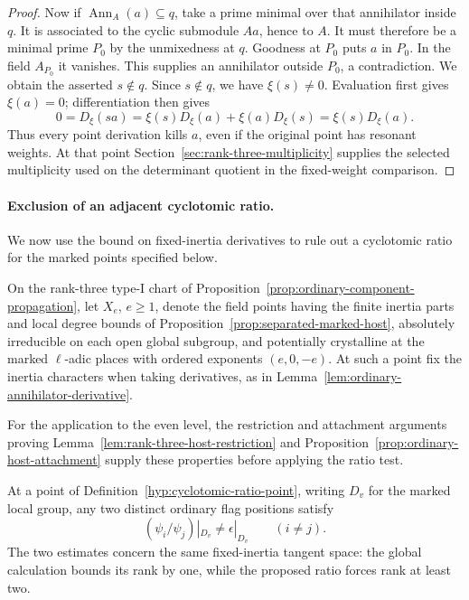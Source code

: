 \begin{proof}
Now if \(\operatorname{Ann}_A(a)\subseteq q\), take a prime
minimal over that annihilator inside \(q\). It is associated
to the cyclic submodule \(Aa\), hence to \(A\). It must
therefore be a minimal prime \(P_0\) by the unmixedness at
\(q\). Goodness at \(P_0\) puts \(a\) in \(P_0\). In the
field \(A_{P_0}\) it vanishes. This supplies an annihilator
outside \(P_0\), a contradiction. We obtain the asserted
\(s\notin q\). Since \(s\notin q\), we have \(\xi(s)\ne0\). Evaluation first gives \(\xi(a)=0\); differentiation then gives 
\[
 0=D_\xi(sa)=\xi(s)D_\xi(a)+\xi(a)D_\xi(s)=\xi(s)D_\xi(a).
\]
 Thus every point derivation kills \(a\), even if the original point has resonant
weights.  At that point Section~\ref{sec:rank-three-multiplicity}
supplies the selected multiplicity used on the determinant
quotient in the fixed-weight comparison.

\end{proof}

\paragraph{Exclusion of an adjacent cyclotomic ratio.}
We now use the bound on fixed-inertia derivatives to rule out a cyclotomic ratio for
the marked points specified below.

\begin{paramdefinition}\label{hyp:cyclotomic-ratio-point}
On the rank-three type-I chart of
Proposition~\ref{prop:ordinary-component-propagation}, let
\(X_e\), \(e\ge1\), denote the field points having the finite
inertia parts and local degree bounds of
Proposition~\ref{prop:separated-marked-host}, absolutely irreducible
on each open global subgroup, and potentially crystalline at the
marked \(\ell\)-adic places with ordered exponents \((e,0,-e)\).
At such a point fix the inertia characters when taking derivatives,
as in Lemma~\ref{lem:ordinary-annihilator-derivative}.
\end{paramdefinition}
For the application to the even level, the restriction and
attachment arguments proving Lemma~\ref{lem:rank-three-host-restriction}
and Proposition~\ref{prop:ordinary-host-attachment} supply these
properties before applying the ratio test.

\begin{proposition}
\label{prop:ordinary-no-cyclotomic-resonance}
At a point of Definition~\ref{hyp:cyclotomic-ratio-point}, writing \(D_v\) for the marked local group, any two distinct ordinary flag positions satisfy 
\[
 (\psi_i/\psi_j)|_{D_v}\ne\epsilon|_{D_v}\qquad(i\ne j).
\]
 The two estimates concern the same
fixed-inertia tangent space: the global calculation bounds its
rank by one, while the proposed ratio forces rank at least two.
\end{proposition}

